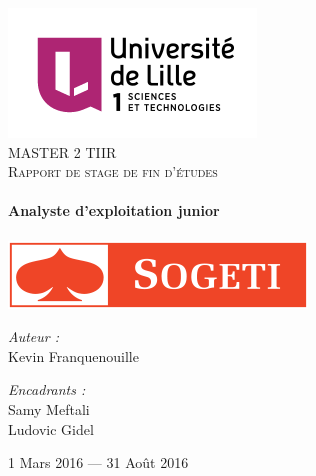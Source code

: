 \begin{titlepage}
  \begin{sffamily}
  \begin{center}

    \includegraphics[scale=0.5]{lille1.png}~\\[2cm]

    \textsc{\LARGE MASTER 2 TIIR}\\[0.2cm]

    \textsc{\large Rapport de stage de fin d'études}\\[4cm]

    \horrule{0.5pt} \\[0.4cm]
    { \huge \bfseries Analyste d'exploitation junior\\[0.4cm] }
    \horrule{0.5pt} \\[2.5cm]
    \includegraphics[scale=0.5]{sogeti.png}
    \\[3cm]

    \begin{minipage}{0.4\textwidth}
      \begin{flushleft} \large
        \emph{Auteur :}\\
        Kevin Franquenouille\\
      \end{flushleft}
    \end{minipage}
    \begin{minipage}{0.4\textwidth}
      \begin{flushright} \large
        \emph{Encadrants :}\\
        Samy Meftali\\
        Ludovic Gidel
      \end{flushright}
    \end{minipage}

    \vfill

    {\large 1\ier{} Mars 2016 — 31 Août 2016}

  \end{center}
  \end{sffamily}
\end{titlepage}